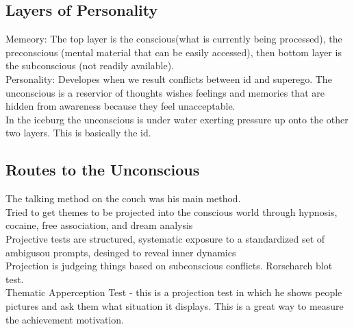 \documentclass{article}
\begin{document}
\subsection*{Layers of Personality}
Memeory: The top layer is the conscious(what is currently being processed), the preconscious (mental material that can be easily accessed), then bottom layer is the subconscious (not readily available). \\
Personality: Developes when we result conflicts between id and superego. The unconscious is a reservior of thoughts wishes feelings and memories that are hidden from awareness because they feel unacceptable. \\
In the iceburg the unconscious is under water exerting pressure up onto the other two layers. This is basically the id.
\subsection*{Routes to the Unconscious}
The talking method on the couch was his main method.\\
Tried to get themes to be projected into the conscious world through hypnosis, cocaine, free association, and dream analysis\\
Projective tests are structured, systematic exposure to a standardized set of ambigusou prompts, desinged to reveal inner dynamics\\
Projection is judgeing things based on subconscious conflicts. Rorscharch blot test.\\
Thematic Apperception Test - this is a projection test in which he shows people pictures and ask them what situation it displays. This is a great way to measure the achievement motivation. 
\end{document}
